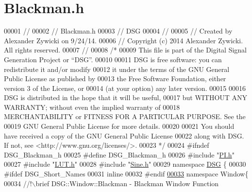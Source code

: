\hypertarget{_blackman_8h_source}{\section{Blackman.\+h}
\label{_blackman_8h_source}
}

\begin{DoxyCode}
00001 \textcolor{comment}{//}
00002 \textcolor{comment}{//  Blackman.h}
00003 \textcolor{comment}{//  DSG}
00004 \textcolor{comment}{//}
00005 \textcolor{comment}{//  Created by Alexander Zywicki on 9/24/14.}
00006 \textcolor{comment}{//  Copyright (c) 2014 Alexander Zywicki. All rights reserved.}
00007 \textcolor{comment}{//}
00008 \textcolor{comment}{/*}
00009 \textcolor{comment}{ This file is part of the Digital Signal Generation Project or “DSG”.}
00010 \textcolor{comment}{}
00011 \textcolor{comment}{ DSG is free software: you can redistribute it and/or modify}
00012 \textcolor{comment}{ it under the terms of the GNU General Public License as published by}
00013 \textcolor{comment}{ the Free Software Foundation, either version 3 of the License, or}
00014 \textcolor{comment}{ (at your option) any later version.}
00015 \textcolor{comment}{}
00016 \textcolor{comment}{ DSG is distributed in the hope that it will be useful,}
00017 \textcolor{comment}{ but WITHOUT ANY WARRANTY; without even the implied warranty of}
00018 \textcolor{comment}{ MERCHANTABILITY or FITNESS FOR A PARTICULAR PURPOSE.  See the}
00019 \textcolor{comment}{ GNU General Public License for more details.}
00020 \textcolor{comment}{}
00021 \textcolor{comment}{ You should have received a copy of the GNU General Public License}
00022 \textcolor{comment}{ along with DSG.  If not, see <http://www.gnu.org/licenses/>.}
00023 \textcolor{comment}{ */}
00024 \textcolor{preprocessor}{#ifndef DSG\_Blackman\_h}
00025 \textcolor{preprocessor}{#define DSG\_Blackman\_h}
00026 \textcolor{preprocessor}{#include "\hyperlink{_p_i_8h}{PI.h}"}
00027 \textcolor{preprocessor}{#include "\hyperlink{_l_u_t_8h}{LUT.h}"}
00028 \textcolor{preprocessor}{#include "\hyperlink{_sine_8h}{Sine.h}"}
00029 \textcolor{keyword}{namespace }\hyperlink{namespace_d_s_g}{DSG} \{
00030 \textcolor{preprocessor}{#ifdef DSG\_Short\_Names}
00031     \textcolor{keyword}{inline}
00032 \textcolor{preprocessor}{#endif}
\hypertarget{_blackman_8h_source_l00033}{}\hyperlink{namespace_d_s_g_1_1_window}{00033}     \textcolor{keyword}{namespace }Window\{\textcolor{comment}{}
00034 \textcolor{comment}{        //!\(\backslash\)brief DSG::Window::Blackman - Blackman Window Function}

\end{DoxyCode}
